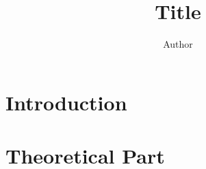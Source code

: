 \documentclass[a4paper]{article}
\title{Title}
\author{Author}
\date{}
\begin{document}
\maketitle

\section{Introduction}  

\section{Theoretical Part}

\section{}


    \begin{thebibliography}{99}


    \end{thebibliography}
\end{document}
